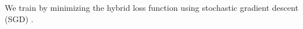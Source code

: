 We train \TRANPCNN by minimizing the hybrid loss function using stochastic gradient descent (SGD) \cite{duchi2011adaptive}.





